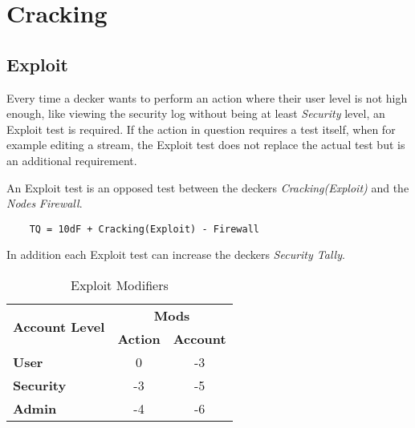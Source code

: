 \hfill

\section{Cracking}
\label{sec: cracking}


\subsection{Exploit}

Every time a decker wants to perform an action where their user level is not high
enough, like viewing the security log without being at least \emph{Security} level,
an Exploit test is required. If the action in question requires a test itself,
when for example editing a stream, the Exploit test does not replace the actual
test but is an additional requirement.

An Exploit test is an opposed test between the deckers \emph{Cracking(Exploit)} and
the \emph{Nodes} \emph{Firewall}.

\begin{verbatim}
    TQ = 10dF + Cracking(Exploit) - Firewall
\end{verbatim}

In addition each Exploit test can increase the deckers \emph{Security Tally}.


\begin{table}[htb]
    \caption[Exploit Modifiers]{Exploit Modifiers}
    \label{tab:exploit mods}
    \centering
    \begin{tabular}{lcc}
        \toprule
        \multirow{2}{*}{\textbf{Account Level}} & \multicolumn{2}{c}{\textbf{Mods}}                    \\
        \cmidrule{2-3}
        {}                                      & \textbf{Action}                   & \textbf{Account} \\
        \midrule
        \textbf{User}                           & 0                                 & -3               \\
        \textbf{Security}                       & -3                                & -5               \\
        \textbf{Admin}                          & -4                                & -6               \\
        \bottomrule
    \end{tabular}
\end{table}


